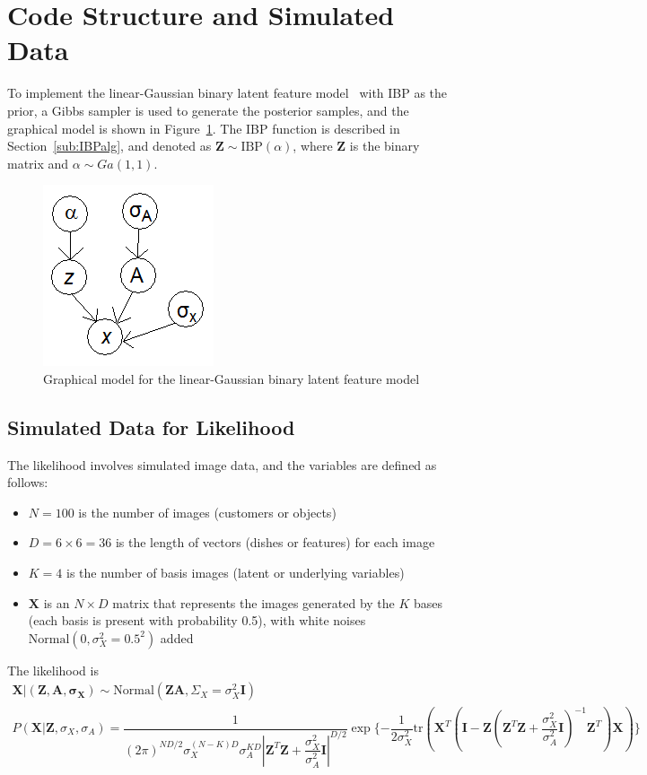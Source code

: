 \section{Code Structure and Simulated Data}
To implement the linear-Gaussian binary latent feature model~\cite{griffiths2005infinite, ibp2012matlab} with IBP as the prior, a Gibbs sampler is used to generate the posterior samples, and the graphical model is shown in Figure~\ref{fig:IBPgeneration}. The IBP function is described in Section~\ref{sub:IBPalg}, and denoted as $\mathbf{Z} \sim \text{IBP}(\alpha)$, where $\mathbf{Z}$ is the binary matrix and $\alpha \sim Ga(1,1)$.

\begin{figure}
\centering
\includegraphics[width=0.25\linewidth]{More_Images/IBP_generation.png}
\caption {Graphical model for the linear-Gaussian binary latent feature model}
\label{fig:IBPgeneration}
\end{figure}

\subsection{Simulated Data for Likelihood}
\label{sub:simulated}

The likelihood involves simulated image data, and the variables are defined as follows:

\begin{itemize}
\item $N = 100$ is the number of images (customers or objects)
\item $D = 6 \times 6 = 36$ is the length of vectors (dishes or features) for each image
\item $K = 4$ is the number of basis images (latent or underlying variables)
\item $\mathbf{X}$ is an $N \times D$ matrix that represents the images generated by the $K$ bases (each basis is present with probability 0.5), with white noises $\text{Normal}(0,\sigma_X^2 = 0.5^2)$ added
\end{itemize}

The likelihood is
\begin{gather}
\mathbf{X}|(\mathbf{Z},\mathbf{A},\mathbf{\sigma_X}) \sim \text{Normal}(\mathbf{ZA},\Sigma_X = \sigma_X^2\mathbf{I}) \\
P(\mathbf{X} | \mathbf{Z}, \sigma_X, \sigma_A) = \dfrac{1}{(2\pi)^{ND/2} \sigma_X^{(N-K)D} \sigma_A^{KD} |\mathbf{Z}^T\mathbf{Z} + \dfrac{\sigma_X^2}{\sigma_A^2}\mathbf{I}|^{D/2}} \exp\{-\dfrac{1}{2\sigma^2_X} \text{tr}(\mathbf{X}^T(\mathbf{I}-\mathbf{Z}(\mathbf{Z}^T\mathbf{Z}+\dfrac{\sigma_X^2}{\sigma_A^2}\mathbf{I})^{-1}\mathbf{Z}^T)\mathbf{X})\}
\end{gather}

